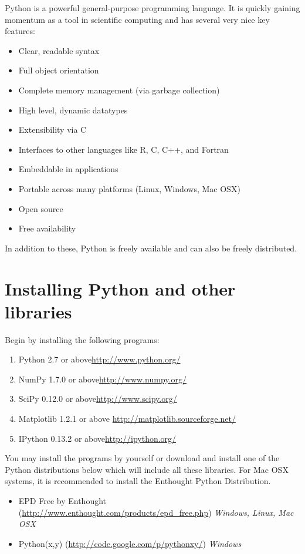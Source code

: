 \label{lab:Essential_Python}

Python is a powerful general-purpose programming language. 
It is quickly gaining momentum as a tool in scientific computing and has several very nice key features:
\begin{itemize}
\item Clear, readable syntax
\item Full object orientation
\item Complete memory management (via garbage collection)
\item High level, dynamic datatypes
\item Extensibility via C
\item Interfaces to other languages like R, C, C++, and Fortran
\item Embeddable in applications
\item Portable across many platforms (Linux, Windows, Mac OSX)
\item Open source
\item Free availability
\end{itemize}
In addition to these, Python is freely available and can also be freely distributed. 

\section*{Installing Python and other libraries}
Begin by installing the following programs:
\begin{enumerate}
\item Python 2.7 or above\url{http://www.python.org/}
\item NumPy 1.7.0 or above\url{http://www.numpy.org/}
\item SciPy 0.12.0 or above\url{http://www.scipy.org/}
\item Matplotlib 1.2.1 or above \url{http://matplotlib.sourceforge.net/}
\item IPython 0.13.2 or above\url{http://ipython.org/}
\end{enumerate}
You may install the programs by yourself or download and install one of the Python distributions below which will include all these libraries.
For Mac OSX systems, it is recommended to install the Enthought Python Distribution.
\begin{itemize}
\item EPD Free by Enthought (\url{http://www.enthought.com/products/epd_free.php}) \emph{Windows, Linux, Mac OSX}
\item Python(x,y) (\url{http://code.google.com/p/pythonxy/}) \emph{Windows}
\end{itemize}

